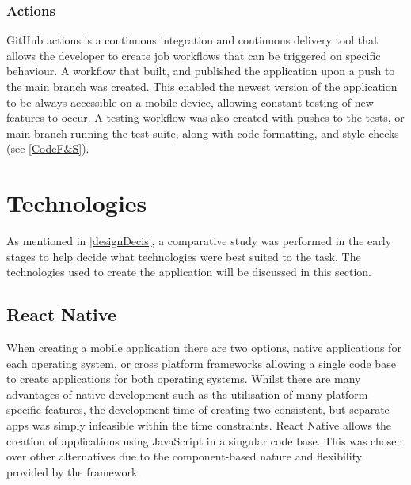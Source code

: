 \subsubsection{Actions}\label{ghActions}
GitHub actions is a continuous integration and continuous delivery tool that allows the developer to create job workflows that can be triggered on specific behaviour. A workflow that built, and published the application upon a push to the main branch was created. This enabled the newest version of the application to be always accessible on a mobile device, allowing constant testing of new features to occur. A testing workflow was also created with pushes to the tests, or main branch running the test suite, along with code formatting, and style checks (see \ref{CodeF&S}).
\section{Technologies}
As mentioned in \ref{designDecis}, a comparative study \cite{compStudy} was performed in the early stages to help decide what technologies were best suited to the task. The technologies used to create the application will be discussed in this section.
\subsection{React Native}\label{reactSection}
When creating a mobile application there are two options, native applications for each operating system, or cross platform frameworks allowing a single code base to create applications for both operating systems. Whilst there are many advantages of native development such as the utilisation of many platform specific features, the development time of creating two consistent, but separate apps was simply infeasible within the time constraints. React Native \cite{reactnative} allows the creation of applications using JavaScript \cite{js} in a singular code base. This was chosen over other alternatives due to the component-based nature and flexibility provided by the framework.
